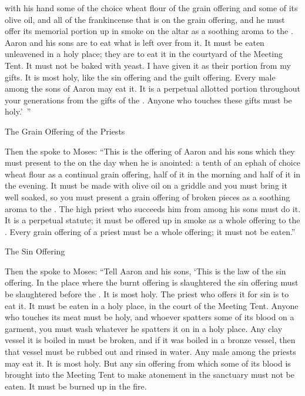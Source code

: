 {with his hand
some of the choice wheat flour
of the
grain offering
and some of its olive oil,
and all
of the frankincense
that
is on
the grain offering,
and he must offer its memorial
portion up in smoke
on the altar
as a soothing
aroma
to the
{}.
Aaron
and his sons
are to eat
what is left over
from
it. It must be eaten
unleavened
in a holy
place;
they are to eat
it in the courtyard
of the Meeting
Tent.
It must not
be baked
with yeast.
I have given
it as their portion
from my gifts.
It is most
holy,
like the sin offering
and the guilt offering.
Every
male
among the sons
of Aaron
may eat
it. It is a perpetual
allotted portion
throughout your generations
from the gifts
of the {}. Anyone
who touches
these gifts must be holy.’ ”
\par }{\SH The Grain Offering of the Priests
\par }{\PP {}Then the
{}
spoke
to
Moses:
“This
is the offering
of Aaron
and his sons
which
they must present
to the
{}
on the day
when he is anointed: a tenth
of an ephah
of choice wheat flour
as a continual
grain offering,
half
of it in the morning
and half
of it in the evening.
It must be made with olive oil
on a griddle
and you must bring
it well soaked,
so you must present
a grain offering
of broken pieces
as a soothing
aroma
to the
{}.
The
high
priest
who succeeds him
from among his sons
must do
it. It is a perpetual
statute;
it must be offered up in smoke
as a whole offering
to the
{}.
Every
grain offering
of a priest
must be a whole offering;
it must not
be eaten.”
\par }{\SH The Sin Offering
\par }{\PP {}Then the
{}
spoke
to
Moses:
“Tell
Aaron
and his sons,
‘This
is the law
of the sin offering.
In the place
where
the burnt offering
is slaughtered
the sin offering
must be slaughtered
before
the {}. It is
most
holy.
The priest
who offers it for sin
is to eat
it. It must be eaten
in a holy
place,
in the court
of the Meeting
Tent.
Anyone
who touches
its meat
must be holy,
and whoever
spatters
some of its blood
on
a garment,
you must wash
whatever
he spatters
it on
in a holy
place.
Any clay vessel
it is boiled
in must be broken,
and if
it was boiled
in a bronze
vessel,
then that vessel must be rubbed
out and rinsed
in water.
Any
male
among the priests
may eat
it. It is
most
holy.
But any
sin offering
from which
some of its blood
is brought
into
the Meeting
Tent
to make atonement
in the sanctuary
must not
be eaten.
It must be burned up
in the fire.

}
